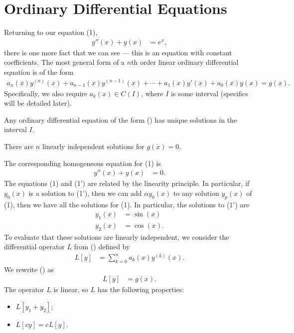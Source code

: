 \documentclass[10pt]{mypackage}
\begin{document}
\section{Ordinary Differential Equations}%
Returning to our equation (1), 
\begin{align*}
  y''(x) + y(x) &= e^x,\tag*{(1)}
\end{align*}
there is one more fact that we can see --- this is an equation with constant coefficients. The most general form of a $n$th order linear ordinary differential equation is of the form
\begin{align*}
  a_n(x)y^{(n)}(x) + a_{n-1}(x)y^{(n-1)}(x) + \cdots + a_1(x)y'(x) + a_0(x)y(x) = g(x).\label{eq:general_linear_ode}\tag{\textdagger}
\end{align*}
Specifically, we also require $a_k(x)\in C(I)$, where $I$ is some interval (specifics will be detailed later).
\begin{theorem}
  Any ordinary differential equation of the form (\textdagger) has unique solutions in the interval $I$.\newline

  There are $n$ linearly independent solutions for $g(x) = 0$.
\end{theorem}
The corresponding homogeneous equation for (1) is
\begin{align*}
  y''(x) + y(x) &= 0.\tag*{(1')}
\end{align*}
The equations (1) and (1') are related by the linearity principle. In particular, if $y_0(x)$ is a solution to (1'), then we can add $\alpha y_0(x)$ to any solution $y_p(x)$ of (1), then we have all the solutions for (1). In particular, the solutions to (1') are
\begin{align*}
  y_1(x) &= \sin(x)\\
  y_2(x) &= \cos(x).
\end{align*}
To evaluate that these solutions are linearly independent, we consider the differential operator $L$ from (\textdagger) defined by
\begin{align*}
  L\left[y\right] &= \sum_{k=0}^{n}a_k(x)y^{(k)}(x).
\end{align*}
We rewrite (\textdagger) as
\begin{align*}
  L\left[y\right] &= g(x).
\end{align*}
The operator $L$ is linear, so $L$ has the following properties:
\begin{itemize}
  \item $L\left[y_1 + y_2\right]$;
  \item $L\left[cy\right] = cL\left[y\right]$.
\end{itemize}
\end{document}
